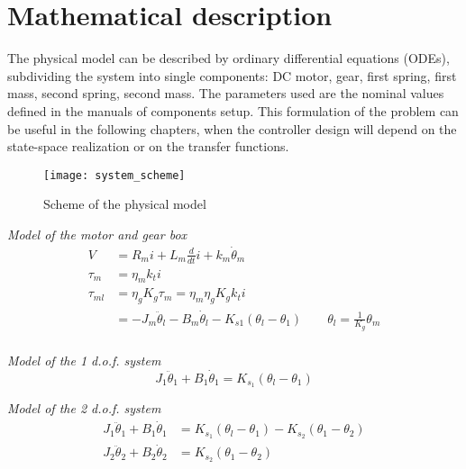\section{Mathematical description}

The physical model can be described by ordinary differential equations (ODEs), subdividing the system into single components: DC motor, gear, first spring, first mass, second spring, second mass. The parameters used are the nominal values defined in the manuals of components setup. This formulation of the problem can be useful in the following chapters, when the controller design will depend on the state-space realization or on the transfer functions.
\begin{figure*}[h]
	\centering
	\texttt{[image: system\_scheme]}
	\caption{Scheme of the physical model}
\end{figure*}

\textit{Model of the motor and gear box}
\begin{subequations}
	\begin{align}
		V &= R_m i + L_m \frac{d}{dt}i + k_m \dot{\theta}_m \\
		\tau_m &= \eta_m k_t i \\
		\tau_{ml} &= \eta_g K_g \tau_m = \eta_m \eta_g K_g k_t i\\
		&= -J_m \ddot{\theta}_l - B_m \dot{\theta}_l - K_{s1} ( \theta_l - \theta_1 ) \qquad  \theta_l = \frac {1}{K_g} \theta_m \\
		\label{model_equations}
	\end{align}
\end{subequations}

\textit{Model of the 1 d.o.f. system}
\begin{equation}
	J_1 \ddot{\theta}_1 + B_1 \dot{\theta}_1 = K_{s_1} ( \theta_l - \theta_1 )
\end{equation}

\textit{Model of the 2 d.o.f. system}
\begin{subequations}
	\begin{align}
		J_1 \ddot{\theta}_1 + B_1 \dot{\theta}_1 &= K_{s_1} ( \theta_l - \theta_1 ) - K_{s_2} ( \theta_1 - \theta_2 ) \\
		J_2 \ddot{\theta}_2 + B_2 \dot{\theta}_2 &= K_{s_2} ( \theta_1 - \theta_2 )
	\end{align}
\end{subequations}

